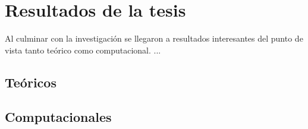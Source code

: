 \chapter{Resultados de la tesis}
\setcounter{page}{23}
\renewcommand{\baselinestretch}{2} %

Al culminar con la investigación se llegaron a resultados interesantes del punto de vista tanto teórico como computacional. ...

\section{Teóricos}
\section{Computacionales}



